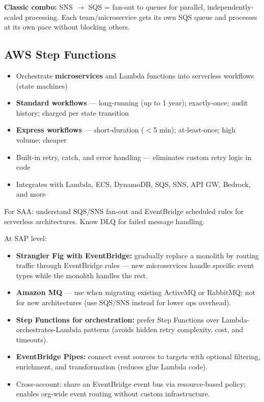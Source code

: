 \begin{examtip}
\textbf{Classic combo:} SNS $\to$ SQS = fan-out to queues for parallel, independently-scaled processing. Each team/microservice gets its own SQS queue and processes at its own pace without blocking others.
\end{examtip}

\subsection{AWS Step Functions}

\begin{keyfacts}
\begin{itemize}
  \item Orchestrate \textbf{microservices} and Lambda functions into serverless workflows (state machines)
  \item \textbf{Standard workflows} --- long-running (up to 1 year); exactly-once; audit history; charged per state transition
  \item \textbf{Express workflows} --- short-duration ($<$5 min); at-least-once; high volume; cheaper
  \item Built-in retry, catch, and error handling --- eliminates custom retry logic in code
  \item Integrates with Lambda, ECS, DynamoDB, SQS, SNS, API GW, Bedrock, and more
\end{itemize}
\end{keyfacts}

\begin{saadepth}
For SAA: understand SQS/SNS fan-out and EventBridge scheduled rules for serverless architectures. Know DLQ for failed message handling.
\end{saadepth}

\begin{sapdepth}
At SAP level:
\begin{itemize}
  \item \textbf{Strangler Fig with EventBridge:} gradually replace a monolith by routing traffic through EventBridge rules --- new microservices handle specific event types while the monolith handles the rest.
  \item \textbf{Amazon MQ} --- use when migrating existing ActiveMQ or RabbitMQ; not for new architectures (use SQS/SNS instead for lower ops overhead).
  \item \textbf{Step Functions for orchestration:} prefer Step Functions over Lambda-orchestrates-Lambda patterns (avoids hidden retry complexity, cost, and timeouts).
  \item \textbf{EventBridge Pipes:} connect event sources to targets with optional filtering, enrichment, and transformation (reduces glue Lambda code).
  \item Cross-account: share an EventBridge event bus via resource-based policy; enables org-wide event routing without custom infrastructure.
\end{itemize}
\end{sapdepth}
